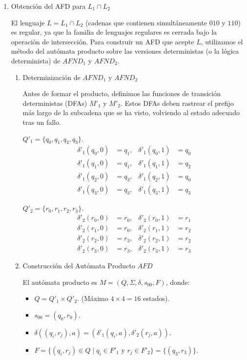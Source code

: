 \begin{solucion}
\begin{enumerate}

\item Obtención del AFD para $L_1 \cap L_2$

El lenguaje $L = L_1 \cap L_2$ (cadenas que contienen simultáneamente $010$ y $110$) es regular, ya que la familia de lenguajes regulares es cerrada bajo la operación de intersección. Para construir un AFD que acepte $L$, utilizamos el método del autómata producto sobre las versiones deterministas (o la lógica determinista) de $AFND_1$ y $AFND_2$.

\begin{enumerate}

\item Determinización de $AFND_1$ y $AFND_2$

Antes de formar el producto, definimos las funciones de transición deterministas (DFAs) $M'_1$ y $M'_2$. Estos DFAs deben rastrear el prefijo más largo de la subcadena que se ha visto, volviendo al estado adecuado tras un fallo.

 $Q'_1 = \{q_0, q_1, q_2, q_3\}$.
\begin{align*}
\delta'_1(q_0, 0) &= q_1, & \delta'_1(q_0, 1) &= q_0 \\
\delta'_1(q_1, 0) &= q_1, & \delta'_1(q_1, 1) &= q_2 \\
\delta'_1(q_2, 0) &= q_3, & \delta'_1(q_2, 1) &= q_0 \\
\delta'_1(q_3, 0) &= q_3, & \delta'_1(q_3, 1) &= q_3
\end{align*}

 $Q'_2 = \{r_0, r_1, r_2, r_3\}$.
\begin{align*}
\delta'_2(r_0, 0) &= r_0, & \delta'_2(r_0, 1) &= r_1 \\
\delta'_2(r_1, 0) &= r_0, & \delta'_2(r_1, 1) &= r_2 \\
\delta'_2(r_2, 0) &= r_3, & \delta'_2(r_2, 1) &= r_2 \\
\delta'_2(r_3, 0) &= r_3, & \delta'_2(r_3, 1) &= r_3
\end{align*}

\item Construcción del Autómata Producto $AFD$

El autómata producto es $M = (Q, \Sigma, \delta, s_{00}, F)$, donde:
\begin{itemize}
    \item $Q = Q'_1 \times Q'_2$. (Máximo $4 \times 4 = 16$ estados).
    \item $s_{00} = (q_0, r_0)$.
    \item $\delta((q_i, r_j), a) = (\delta'_1(q_i, a), \delta'_2(r_j, a))$.
    \item $F = \{(q_i, r_j) \in Q \mid q_i \in F'_1 \text{ y } r_j \in F'_2\} = \{(q_3, r_3)\}$.
\end{itemize}


\end{enumerate}
\end{enumerate}
\end{solucion}
